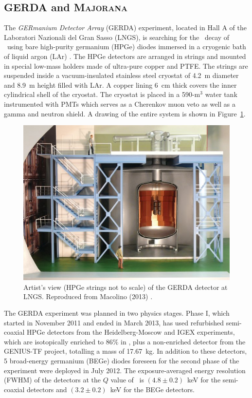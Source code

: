 \documentclass{PoS}
\begin{document}
\subsection{GERDA and {\scshape Majorana}} \label{subsec:GERDA}
The \emph{GERmanium Detector Array} (GERDA) experiment, located in Hall A of the Laboratori Nazionali del Gran Sasso (LNGS), is searching for the \bbonu\ decay of \GE\ using bare high-purity germanium (HPGe) diodes immersed in a cryogenic bath of liquid argon (LAr) \cite{Ackermann:2012xja}. The HPGe detectors are arranged in strings and mounted in special low-mass holders made of ultra-pure copper and PTFE. The strings are suspended inside a vacuum-insulated stainless steel cryostat of 4.2~m diameter and 8.9~m height filled with LAr. A copper lining 6~cm thick covers the inner cylindrical shell of the cryostat. The cryostat is placed in a 590-m$^{3}$ water tank instrumented with PMTs which serves as a Cherenkov muon veto as well as a gamma and neutron shield. A drawing of the entire system is shown in Figure~\ref{fig:GERDA}.

\begin{figure}
\centering
\includegraphics[width=.75\textwidth]{img/GERDA.jpg}
\caption{Artist's view (HPGe strings not to scale) of the GERDA detector at LNGS. Reproduced from Macolino (2013) \cite{Macolino:2013hca}.} \label{fig:GERDA}
\end{figure}

The GERDA experiment was planned in two physics stages.
Phase I, which started in November 2011 and ended in March 2013, has used refurbished semi-coaxial HPGe detectors from the Heidelberg-Moscow and IGEX experiments, which are isotopically enriched to 86\% in \GE, plus a non-enriched detector from the GENIUS-TF project, totalling a mass of 17.67~kg. In addition to these detectors, 5 broad-energy germanium (BEGe) diodes foreseen for the second phase of the experiment were deployed in July 2012. The exposure-averaged energy resolution (FWHM) of the detectors at the $Q$ value of \GE\ is $(4.8\pm0.2)$~keV for the semi-coaxial detectors and $(3.2\pm0.2)$~keV for the BEGe detectors.
\end{document}

